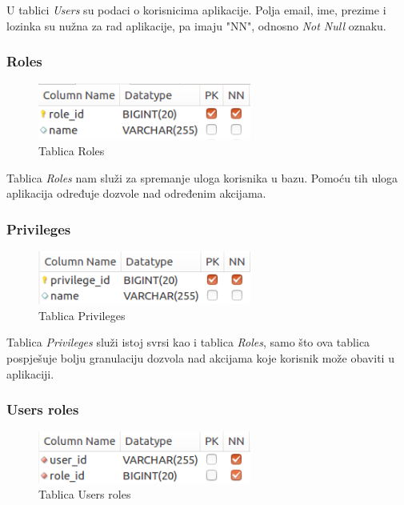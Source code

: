 \documentclass[zavrsni, numeric]{fer}
\begin{document}
U tablici \textit{Users} su podaci o korisnicima aplikacije. Polja email, ime, prezime i lozinka su nužna za rad aplikacije, pa imaju "NN", odnosno \textit{Not Null} oznaku.

\subsubsection{Roles}

\begin{figure}[H]
	\centering
	\includegraphics[width=7cm]{slike/t-roles.png}
	\caption{Tablica Roles}
	\label{fig:t-roles}
\end{figure}

Tablica \textit{Roles} nam služi za spremanje uloga korisnika u bazu. Pomoću tih uloga aplikacija određuje dozvole nad određenim akcijama.

\subsubsection{Privileges}

\begin{figure}[H]
	\centering
	\includegraphics[width=7cm]{slike/t-privileges.png}
	\caption{Tablica Privileges}
	\label{fig:t-privileges}
\end{figure}

Tablica \textit{Privileges} služi istoj svrsi kao i tablica \textit{Roles}, samo što ova tablica pospješuje bolju granulaciju dozvola nad akcijama koje korisnik može obaviti u aplikaciji.

\subsubsection{Users roles}

\begin{figure}[H]
	\centering
	\includegraphics[width=7cm]{slike/t-users_roles.png}
	\caption{Tablica Users roles}
	\label{fig:t-users_roles}
\end{figure}
\end{document}
